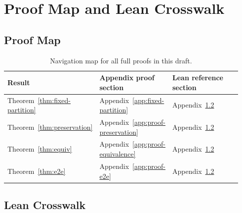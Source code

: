 \documentclass[11pt]{article}
\begin{document}
\appendix

\section{Proof Map and Lean Crosswalk}\label{app:proof-map}

\subsection{Proof Map}

\begin{table}[h]
\centering
\small
\begin{tabular}{p{0.34\linewidth}p{0.24\linewidth}p{0.36\linewidth}}
\toprule
Result & Appendix proof section & Lean reference section \\
\midrule
Theorem~\ref{thm:fixed-partition} & Appendix~\ref{app:fixed-partition} & Appendix~\ref{app:lean-crosswalk} \\
Theorem~\ref{thm:preservation} & Appendix~\ref{app:proof-preservation} & Appendix~\ref{app:lean-crosswalk} \\
Theorem~\ref{thm:equiv} & Appendix~\ref{app:proof-equivalence} & Appendix~\ref{app:lean-crosswalk} \\
Theorem~\ref{thm:e2e} & Appendix~\ref{app:proof-e2e} & Appendix~\ref{app:lean-crosswalk} \\
\bottomrule
\end{tabular}
\caption{Navigation map for all full proofs in this draft.}
\end{table}

\subsection{Lean Crosswalk}\label{app:lean-crosswalk}
\end{document}
